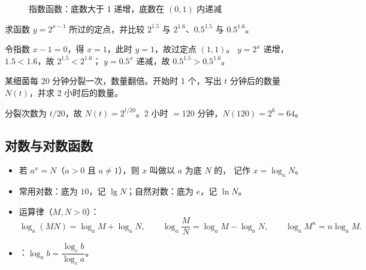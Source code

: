 \begin{explore}
\begin{figure}[htbp]
  \centering
  \caption{指数函数：底数大于 1 递增，底数在 $(0,1)$ 内递减}
\end{figure}

\begin{example}
求函数 $y=2^{x-1}$ 所过的定点，并比较 $2^{1.5}$ 与 $2^{1.6}$、$0.5^{1.5}$ 与 $0.5^{1.6}$。
\end{example}
\begin{solution}
令指数 $x-1=0$，得 $x=1$，此时 $y=1$，故过定点 $(1,1)$。
$y=2^x$ 递增，$1.5<1.6$，故 $2^{1.5}<2^{1.6}$；
$y=0.5^x$ 递减，故 $0.5^{1.5}>0.5^{1.6}$。
\end{solution}

\begin{problem}
某细菌每 20 分钟分裂一次，数量翻倍。开始时 1 个，写出 $t$ 分钟后的数量 $N(t)$，并求 2 小时后的数量。
\end{problem}
\begin{solution}
分裂次数为 $t/20$，故 $N(t)=2^{t/20}$。2 小时 $=120$ 分钟，$N(120)=2^6=64$。
\end{solution}

\subsection{对数与对数函数}

\begin{itemize}
  \item 若 $a^x=N$（$a>0$ 且 $a\neq1$），则 $x$ 叫做以 $a$ 为底 $N$ 的，
        记作 $x=\log_a N$。
  \item 常用对数：底为 $10$，记 $\lg N$；自然对数：底为 $e$，记 $\ln N$。
  \item 运算律（$M,N>0$）：
        \[
          \log_a(MN)=\log_a M+\log_a N,\qquad
          \log_a\frac{M}{N}=\log_a M-\log_a N,\qquad
          \log_a M^n=n\log_a M.
        \]
  \item {}：$\log_a b=\dfrac{\log_c b}{\log_c a}$。
\end{itemize}


\end{explore}

